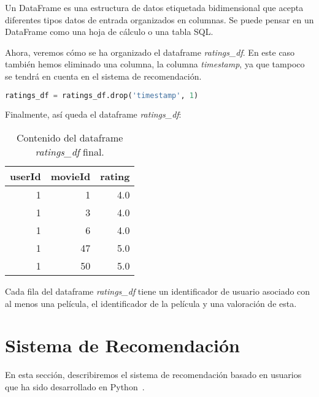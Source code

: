 \documentclass{uimppracticas}
\begin{document}
\begin{definition}\label{dataframe}
	Un DataFrame es una estructura de datos etiquetada bidimensional que acepta diferentes tipos datos de entrada organizados en columnas. Se puede pensar en un DataFrame como una hoja de cálculo o una tabla SQL.
\end{definition}

Ahora, veremos cómo se ha organizado el dataframe \textit{ratings\_df}. En este caso también hemos eliminado una columna, la columna \textit{timestamp}, ya que tampoco se tendrá en cuenta en el sistema de recomendación.

\begin{lstlisting}[language=python]
ratings_df = ratings_df.drop('timestamp', 1)
\end{lstlisting}

Finalmente, así queda el dataframe \textit{ratings\_df}:

\begin{table}[h]
	\centering
	\begin{tabular}{rrr}
		\toprule
		userId &  movieId &  rating \\
		\midrule
		1 &        1 &     4.0 \\
		1 &        3 &     4.0 \\
		1 &        6 &     4.0 \\
		1 &       47 &     5.0 \\
		1 &       50 &     5.0 \\
		\bottomrule
	\end{tabular}
	\caption{Contenido del dataframe \textit{ratings\_df} final.}
	\label{ratings_df_final}
\end{table}


Cada fila del dataframe \textit{ratings\_df} tiene un identificador de usuario asociado con al menos una película, el identificador de la película y una valoración de esta. 

\newpage

\section{Sistema de Recomendación}\label{sistema_recomendacion}

En esta sección, describiremos el sistema de recomendación basado en usuarios que ha sido desarrollado en Python~\cite{GitHubRepo}.
\end{document}

